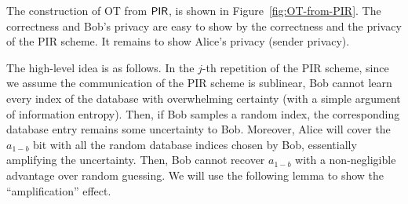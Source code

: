 The construction of OT from ${\sf PIR}$, is shown in Figure~\ref{fig:OT-from-PIR}.
The correctness and Bob's privacy are easy to show by the correctness and the privacy of the PIR scheme. It remains to show Alice's privacy (sender privacy).

The high-level idea is as follows. In the $j$-th repetition of the PIR scheme, since we assume the communication of the PIR scheme is sublinear, Bob cannot learn every index of the database with overwhelming certainty (with a simple argument of information entropy). Then, if Bob samples a random index, the corresponding database entry remains some uncertainty to Bob.
Moreover, Alice will cover the $a_{1-b}$ bit with all the random database indices chosen by Bob, essentially amplifying the uncertainty.
Then, Bob cannot recover $a_{1-b}$ with a non-negligible advantage over random guessing.
We will use the following lemma to show the ``amplification'' effect.



